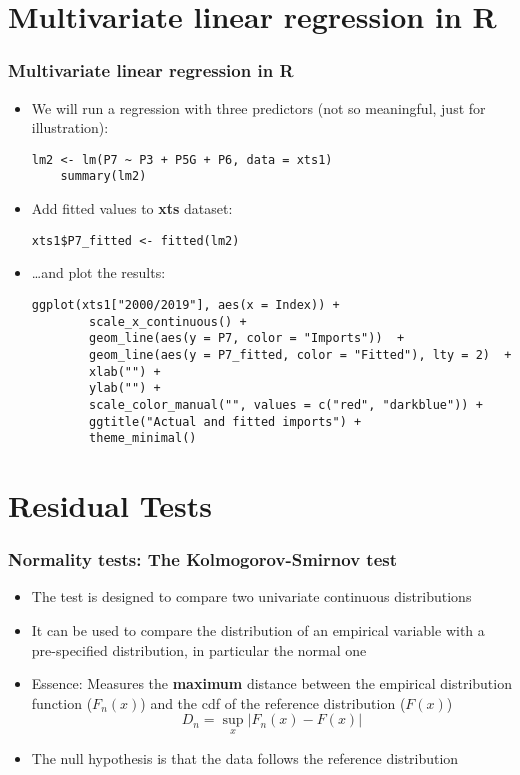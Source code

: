 \documentclass[10pt]{beamer}
\theoremstyle{definition}
\begin{document}
\section{Multivariate linear regression in R}
\begin{frame}[fragile]
\frametitle{Multivariate linear regression in R}
\begin{itemize}
	\item We will run a regression with three predictors (not so meaningful, just for illustration):
	\begin{lstlisting}[style = rstyle, breaklines]
	lm2 <- lm(P7 ~ P3 + P5G + P6, data = xts1)
	summary(lm2)
	\end{lstlisting}
	
	\item Add fitted values to \textbf{xts} dataset:
	\begin{lstlisting}[style = rstyle, breaklines]
	xts1$P7_fitted <- fitted(lm2)	
	\end{lstlisting}
	
	\item \ldots and plot the results:
	\begin{lstlisting}[style = rstyle, breaklines]
	ggplot(xts1["2000/2019"], aes(x = Index)) + 
		scale_x_continuous() +
		geom_line(aes(y = P7, color = "Imports"))  + 
		geom_line(aes(y = P7_fitted, color = "Fitted"), lty = 2)  + 
		xlab("") + 
		ylab("") + 
		scale_color_manual("", values = c("red", "darkblue")) +
		ggtitle("Actual and fitted imports") + 
		theme_minimal()
	\end{lstlisting}
\end{itemize}
\end{frame}

\section{Residual Tests}
\begin{frame}[fragile]
\frametitle{Normality tests: The Kolmogorov-Smirnov test}
\begin{itemize}
	\item The test is designed to compare two univariate continuous distributions
	\item It can be used to compare the distribution of an empirical variable with a pre-specified distribution, in particular the normal one
	\item Essence: Measures the \textbf{maximum} distance between the empirical distribution function ($F_{n}(x)$) and the cdf of the reference distribution ($F(x)$)
	\[
		D_{n} = \sup_{x}|F_{n}(x) - F(x)|
	\]
	\item The null hypothesis is that the data follows the reference distribution 
\end{itemize}
\end{frame}
\end{document}
